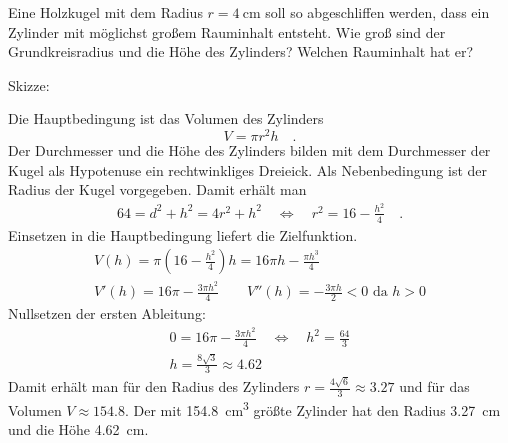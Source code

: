 \documentclass[auto-toc=false,babel=ngerman]{arbeitsblatt}
\begin{document}
\begin{question}
  Eine Holzkugel mit dem Radius $r=\SI{4}{\centi\metre}$ soll so abgeschliffen
  werden, dass ein Zylinder mit möglichst großem Rauminhalt entsteht.  Wie
  groß sind der Grundkreisradius und die Höhe des Zylinders?  Welchen
  Rauminhalt hat er?
\end{question}
\begin{solution}
  Skizze:
  \begin{center}
  \end{center}
  Die Hauptbedingung ist das Volumen des Zylinders \[ V = \pi r^2h \quad. \]
  Der Durchmesser und die Höhe des Zylinders bilden mit dem Durchmesser der
  Kugel als Hypotenuse ein rechtwinkliges Dreieick.  Als Nebenbedingung ist
  der Radius der Kugel vorgegeben.  Damit erhält man
  \begin{gather*}
    64 = d^2 + h^2 = 4r^2+h^2 \quad\Leftrightarrow\quad
    r^2 = 16 - \frac{h^2}{4} \quad.
  \end{gather*}
  Einsetzen in die Hauptbedingung liefert die Zielfunktion.
  \begin{gather*}
    V(h)   = \pi\left(16-\frac{h^2}{4}\right)h 
           = 16\pi h - \frac{\pi h^3}{4} \\
    V'(h)  = 16\pi - \frac{3\pi h^2}{4} \qquad
    V''(h) = -\frac{3\pi h}{2} < 0 \text{ da } h>0
  \end{gather*}
  Nullsetzen der ersten Ableitung:
  \begin{gather*}
    0 = 16\pi - \frac{3\pi h^2}{4} \quad\Leftrightarrow\quad
    h^2 = \frac{64}{3} \\
    h = \frac{8\sqrt{3}}{3} \approx \num{4.62}
  \end{gather*}
  Damit erhält man für den Radius des Zylinders $r = \frac{4\sqrt{6}}{3}
  \approx \num{3.27} $ und für das Volumen $V \approx \num{154.8}$.
  Der mit \SI{154.8}{\centi\metre\cubed} größte Zylinder hat den Radius
  \SI{3.27}{\centi\metre} und die Höhe \SI{4.62}{\centi\metre}.
\end{solution}
\end{document}

